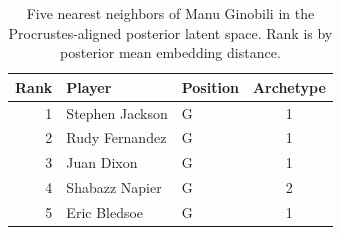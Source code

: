 \begin{table}[htbp]
  \centering\small
  \begin{tabular}{rllc}
    \toprule
    Rank & Player & Position & Archetype \\
    \midrule
    1 & Stephen Jackson & G & 1 \\
    2 & Rudy Fernandez & G & 1 \\
    3 & Juan Dixon & G & 1 \\
    4 & Shabazz Napier & G & 2 \\
    5 & Eric Bledsoe & G & 1 \\
    \bottomrule
  \end{tabular}
  \caption{Five nearest neighbors of Manu Ginobili in the Procrustes-aligned posterior latent space. Rank is by posterior mean embedding distance.}
  \label{tab:Manu_Ginobili_neighbors}
\end{table}

